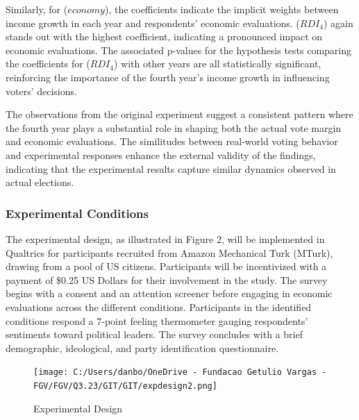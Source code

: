 \documentclass[
]{article}
\begin{document}
Similarly, for (\(economy\)), the coefficients indicate the implicit
weights between income growth in each year and respondents' economic
evaluations. (\(RDI_4\)) again stands out with the highest coefficient,
indicating a pronounced impact on economic evaluations. The associated
p-values for the hypothesis tests comparing the coefficients for
(\(RDI_4\)) with other years are all statistically significant,
reinforcing the importance of the fourth year's income growth in
influencing voters' decisions.

\begin{center}
  
\end{center}

The observations from the original experiment suggest a consistent
pattern where the fourth year plays a substantial role in shaping both
the actual vote margin and economic evaluations. The similitudes between
real-world voting behavior and experimental responses enhance the
external validity of the findings, indicating that the experimental
results capture similar dynamics observed in actual elections.

\hypertarget{experimental-conditions}{%
\subsubsection{Experimental Conditions}\label{experimental-conditions}}

The experimental design, as illustrated in Figure 2, will be implemented
in Qualtrics for participants recruited from Amazon Mechanical Turk
(MTurk), drawing from a pool of US citizens. Participants will be
incentivized with a payment of \$0.25 US Dollars for their involvement
in the study. The survey begins with a consent and an attention screener
before engaging in economic evaluations across the different conditions.
Participants in the identified conditions respond a 7-point feeling
thermometer gauging respondents' sentiments toward political leaders.
The survey concludes with a brief demographic, ideological, and party
identification questionnaire.

\begin{figure}
\hypertarget{fig:label}{%
\centering
\texttt{[image: C:/Users/danbo/OneDrive - Fundacao Getulio Vargas - FGV/FGV/Q3.23/GIT/GIT/expdesign2.png]}
\caption{Experimental Design}\label{fig:label}
}
\end{figure}
\end{document}
